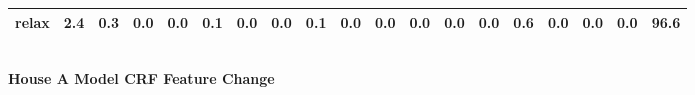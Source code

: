 \documentclass{article}
\begin{document}
\begin{sideways}
\begin{tabular}{lrrrrrrrrrrrrrrrrrr}
relax                         &         2.4 &                0.3 &           0.0 &                          0.0 &                0.1 &                0.0 &                        0.0 &          0.1 &              0.0 &                0.0 &                    0.0 &                      0.0 &                  0.0 &                   0.6 &              0.0 &              0.0 &                                  0.0 &         96.6 \\
\bottomrule
\end{tabular}
\end{sideways}
\normalsize
\vspace{1cm}\\
\textbf{House A Model CRF Feature Change}\\
\vspace{1cm}\\
\end{document}
